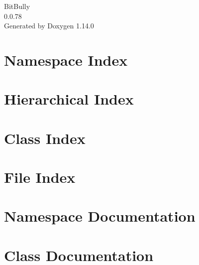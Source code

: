 \documentclass[twoside]{book}
\newcommand{\+}{\discretionary{\mbox{\scriptsize$\hookleftarrow$}}{}{}}
\newcommand{\clearemptydoublepage}{%
    \newpage{\pagestyle{empty}\cleardoublepage}%
  }
\begin{document}
  \raggedbottom
    \hypersetup{pageanchor=false,
                bookmarksnumbered=true,
                pdfencoding=unicode
               }
  \begin{titlepage}
  \vspace*{7cm}
  \begin{center}%
  {\Large Bit\+Bully}\\
  [1ex]\large 0.\+0.\+78 \\
  \vspace*{1cm}
  {\large Generated by Doxygen 1.14.0}\\
  \end{center}
  \end{titlepage}
  \clearemptydoublepage
  \tableofcontents
  \clearemptydoublepage
  \hypersetup{pageanchor=true}
\chapter{Namespace Index}

\chapter{Hierarchical Index}

\chapter{Class Index}

\chapter{File Index}

\chapter{Namespace Documentation}





\chapter{Class Documentation}

















\end{document}
